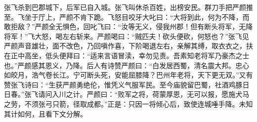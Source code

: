 张飞杀到巴郡城下，后军已自入城。张飞叫休杀百姓，出榜安民。群刀手把严颜推至。飞坐于厅上，严颜不肯下跪。飞怒目咬牙大叱曰：“大将到此，何为不降，而敢拒敌？”严颜全无惧色，回叱飞曰：“汝等无义，侵我州郡！但有断头将军，无降将军！”飞大怒，喝左右斩来。严颜喝曰：“贼匹夫！砍头便砍，何怒也？”张飞见严颜声音雄壮，面不改色，乃回嗔作喜，下阶喝退左右，亲解其缚，取衣衣之，扶在正中高坐，低头便拜曰：“适来言语冒渎，幸勿见责。吾素知老将军乃豪杰之士也。”严颜感其恩义，乃降。后人有诗赞严颜曰：“白发居西蜀，清名震大邦。忠心如皎月，浩气卷长江。宁可断头死，安能屈膝降？巴州年老将，天下更无双。”又有赞张飞诗曰：“生获严颜勇绝伦，惟凭义气服军民。至今庙貌留巴蜀，社酒鸡豚日日春。”张飞请问入川之计。严颜曰：“败军之将，荷蒙厚恩，无可以报，愿施犬马之劳，不须张弓只箭，径取成都。”正是：只因一将倾心后，致使连城唾手降。未知其计如何，且看下文分解。